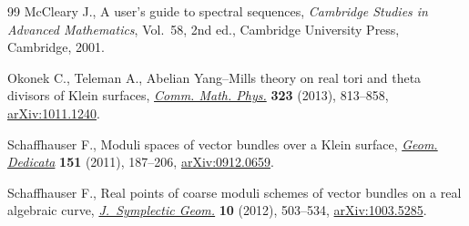 \documentclass[pdftex]{sigma}
\numberwithin{equation}{section}
\begin{document}
\begin{thebibliography}{99}
McCleary J., A user's guide to spectral sequences, \textit{Cambridge Studies in
 Advanced Mathematics}, Vol.~58, 2nd ed., Cambridge University Press,
 Cambridge, 2001.

Okonek C., Teleman A., Abelian {Y}ang--{M}ills theory on real tori and theta
 divisors of {K}lein surfaces, \href{http://dx.doi.org/10.1007/s00220-013-1793-z}{\textit{Comm. Math. Phys.}} \textbf{323} (2013),
 813--858, \href{http://arxiv.org/abs/1011.1240}{arXiv:1011.1240}.

Schaf\/fhauser F., Moduli spaces of vector bundles over a {K}lein surface,
 \href{http://dx.doi.org/10.1007/s10711-010-9526-3}{\textit{Geom. Dedicata}} \textbf{151} (2011), 187--206, \href{http://arxiv.org/abs/0912.0659}{arXiv:0912.0659}.

Schaf\/fhauser F., Real points of coarse moduli schemes of vector bundles on a
 real algebraic curve, \href{http://dx.doi.org/10.4310/JSG.2012.v10.n4.a2}{\textit{J.~Symplectic Geom.}} \textbf{10} (2012),
 503--534, \href{http://arxiv.org/abs/1003.5285}{arXiv:1003.5285}.

\end{thebibliography}\LastPageEnding
\end{document}
